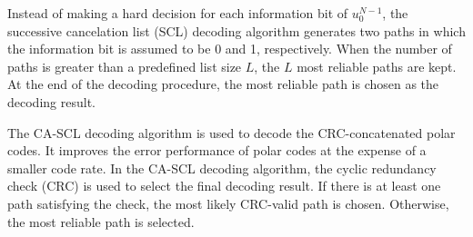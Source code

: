 \documentclass{article}
\begin{document}
Instead of making a hard decision for each information bit of $u^{N-1}_0$, the successive cancelation list (SCL) decoding algorithm  \cite{tal2015list} generates two paths in which the information bit is assumed to be 0 and 1, respectively. When the number of paths
is greater than a predefined list size $L$, the $L$ most reliable paths are
kept. At the end of the decoding procedure, the most reliable path is chosen as
the decoding result.

The CA-SCL decoding algorithm \cite{niu2012crc} is used to decode the CRC-concatenated polar
codes. It improves the error performance of polar codes at the expense
of a smaller code rate. In the CA-SCL decoding algorithm, the cyclic redundancy check (CRC)
is used to select the final decoding result. If there
is at least one path satisfying the check, the most likely CRC-valid
path is chosen. Otherwise, the most reliable path is selected.


\end{document}
